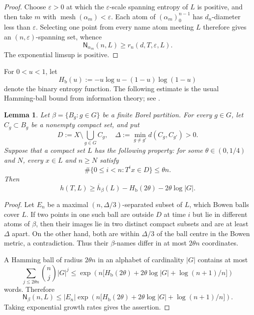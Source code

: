 \documentclass[12pt,letterpaper,reqno]{amsart}
\newcommand{\mesh}{\operatorname{mesh}}
\newcommand{\Nname}{\mathsf N}
\newcommand{\Hb}{H_{\mathrm b}}
\newtheorem{lemma}[theorem]{Lemma}
\theoremstyle{definition}
\theoremstyle{remark}
\numberwithin{equation}{section}
\begin{document}
	\begin{proof}
		Choose $\varepsilon>0$ at which the $\varepsilon$-scale spanning entropy of
		$L$ is positive, and then take $m$ with
		$\mesh(\alpha_m)<\varepsilon$. Each atom of
		$(\alpha_m)_0^{n-1}$ has $d_n$-diameter less than $\varepsilon$. Selecting
		one point from every name atom meeting $L$ therefore gives an
		$(n,\varepsilon)$-spanning set, whence
		\[
		\Nname_{\alpha_m}(n,L)\geq r_n(d,T,\varepsilon,L).
		\]
		The exponential limsup is positive.
	\end{proof}
	
	For $0<u<1$, let
	\[
	\Hb(u):=-u\log u-(1-u)\log(1-u)
	\]
	denote the binary entropy function. The following estimate is the usual
	Hamming-ball bound from information theory; see
	\cite{CoverThomas2006,Shannon1949}.
	
	\begin{lemma}
		\label{lem:hamming-bowen}
		Let $\beta=\{B_g:g\in G\}$ be a finite Borel partition. For every $g\in G$,
		let $C_g\subset B_g$ be a nonempty compact set, and put
		\[
		D:=X\setminus\bigcup_{g\in G}C_g,
		\quad
		\Delta:=\min_{g\neq g'}d(C_g,C_{g'})>0.
		\]
		Suppose that a compact set $L$ has the following property: for some
		$\theta\in(0,1/4)$ and $N$, every $x\in L$ and $n\geq N$ satisfy
		\[
		\#\{0\leq i<n:T^ix\in D\}\leq\theta n.
		\]
		Then
		\[
		h(T,L)
		\geq
		\overline h_\beta(L)-\Hb(2\theta)-2\theta\log|G|.
		\]
	\end{lemma}
	
	\begin{proof}
		Let $E_n$ be a maximal $(n,\Delta/3)$-separated subset of $L$, which Bowen balls cover $L$. If two points in one such ball are outside $D$ at time $i$
		but lie in different atoms of $\beta$, then their images lie in two distinct
		compact subsets and are at least $\Delta$ apart. On the other hand, both are
		within $\Delta/3$ of the ball centre in the Bowen metric, a contradiction.
		Thus their $\beta$-names differ in at most $2\theta n$ coordinates.
		
		A Hamming ball of radius $2\theta n$ in an alphabet of cardinality $|G|$
		contains at most
		\[
		\sum_{j\leq2\theta n}\binom nj|G|^j
		\leq
		\exp\left(
		n\bigl[\Hb(2\theta)+2\theta\log|G|+\log(n+1)/n\bigr]
		\right)
		\]
		words. Therefore
		\[
		\Nname_\beta(n,L)
		\leq
		|E_n|
		\exp\left(
		n\bigl[\Hb(2\theta)+2\theta\log|G|+\log(n+1)/n\bigr]
		\right).
		\]
		Taking exponential growth rates gives the assertion.
	\end{proof}
	
\end{document}
